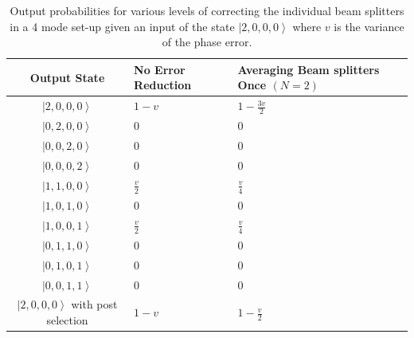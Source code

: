 \documentclass[aps,pra,twocolumn,superscriptaddress,numerical,floatfix]{revtex4-1}
\begin{document}
\begin{widetext}
\begin{table}
{\begin{centering}
	\begin{tabular}{|c|>{\centering}p{4cm}|>{\centering}p{4cm}|}
		\hline 
		Output State & No Error Reduction & Averaging Beam splitters Once $\left(N=2\right)$\tabularnewline
		\hline 
		\hline 
		$\left|2,0,0,0\right\rangle $ & $1-v$ & $1-\frac{3v}{2}$\tabularnewline
		\hline 
		$\left|0,2,0,0\right\rangle $ & $0$ & $0$\tabularnewline
		\hline 
		$\left|0,0,2,0\right\rangle $ & $0$ & $0$\tabularnewline
		\hline 
		$\left|0,0,0,2\right\rangle $ & $0$ & $0$\tabularnewline
		\hline 
		$\left|1,1,0,0\right\rangle $ & $\frac{v}{2}$ & $\frac{v}{4}$\tabularnewline
		\hline 
		$\left|1,0,1,0\right\rangle $ & $0$ & $0$\tabularnewline
		\hline 
		$\left|1,0,0,1\right\rangle $ & $\frac{v}{2}$ & $\frac{v}{4}$\tabularnewline
		\hline 
		$\left|0,1,1,0\right\rangle $ & $0$ & $0$\tabularnewline
		\hline 
		$\left|0,1,0,1\right\rangle $ & $0$ & $0$\tabularnewline
		\hline 
		$\left|0,0,1,1\right\rangle $ & $0$ & $0$\tabularnewline
		\hline 
		$\left|2,0,0,0\right\rangle $ with post selection & $1-v$ & $1-\frac{v}{2}$\tabularnewline
		\hline 
	\end{tabular}
	\par\end{centering}

}

\caption[Output probabilities for various levels of correcting the individual
beam splitters in a 4 mode set-up given an input of the state $\left|2,0,0,0\right\rangle $.]{Output probabilities for various levels of correcting the individual
beam splitters in a 4 mode set-up given an input of the state $\left|2,0,0,0\right\rangle $
where $v$ is the variance of the phase error. \label{tab:2 photon output prob bs}}
\end{table}
\begin{table}
\resizebox{\textwidth}{!}{

}
\end{table}
\end{widetext}
\end{document}
